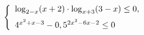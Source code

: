 \begin{ex}[type=ineq_system]
	\begin{condition}
		\( \left\{
		\begin{array}{l}
			\log_{2-x}(x+2)\cdot\log_{x+3}(3-x)\le0,\vspace{2mm}\\
			4^{x^2+x-3}-0,5^{2x^2-6x-2}\le0
		\end{array}
		\right. \)
	\end{condition}
\end{ex}